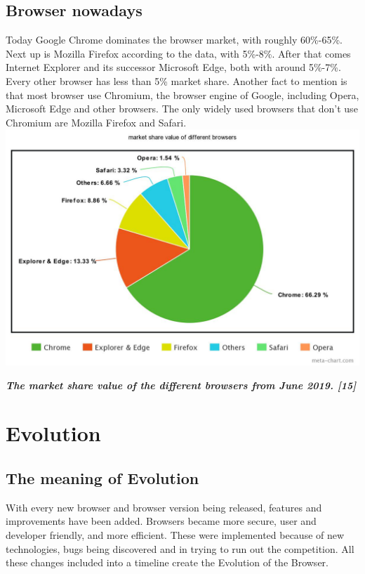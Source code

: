 \documentclass[runningheads]{llncs}
\begin{document}
		\subsection{Browser nowadays}
		Today Google Chrome dominates the browser market, with roughly 60\%-65\%. Next up is Mozilla Firefox according to the data, with 5\%-8\%. After that comes  Internet Explorer and its successor Microsoft Edge, both with around 5\%-7\%. Every other browser has less than 5\% market share. Another fact to mention is that most browser use Chromium, the browser engine of Google, including Opera, Microsoft Edge and other browsers. The only widely used browsers that don't use Chromium are Mozilla Firefox and Safari.\\
		\includegraphics[scale=0.3]{meta-chart.jpeg}\\
		\begin{center}
			\textit{\textbf{The market share value of the different browsers from June 2019. [15]}}
		\end{center}
		
	\section{Evolution}
		\subsection{The meaning of Evolution}
		With every new browser and browser version being released, features and improvements have been added. Browsers became more secure, user and developer friendly, and more efficient. These were implemented because of new technologies, bugs being discovered and in trying to run out the competition. All these changes included into a timeline create the Evolution of the Browser.
\end{document}
